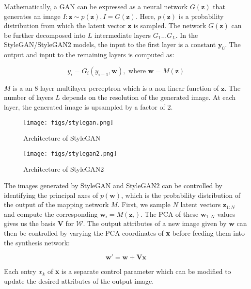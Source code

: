 Mathematically, a GAN can be expressed as a neural network $G(\textbf{z})$ that generates an image $I: \textbf{z} \sim p(\textbf{z}), I = G(\textbf{z})$. Here, $p(\textbf{z})$ is a probability distribution from which the latent vector $\textbf{z}$ is sampled. The network $G(\textbf{z})$ can be further decomposed into $L$ intermediate layers $G_1\ldots G_L$. In the StyleGAN/StyleGAN2 models, the input to the first layer is a constant $\textbf{y}_0$. The output and input to the remaining layers is computed as:

\begin{equation}
  y_i = G_i(y_{i-1}, \mathbf{w}),\text{ where }\mathbf{w} = M(\mathbf{z})
\end{equation}

$M$ is a an $8$-layer multilayer perceptron which is a non-linear function of $\textbf{z}$. The number of layers $L$ depends on the resolution of the generated image. At each layer, the generated image is upsampled by a factor of $2$.

\begin{figure}[H]
  \centering
  \texttt{[image: figs/stylegan.png]}
  \caption{Architecture of StyleGAN \cite{stylegan}}
  \label{fig:stylegan}
\end{figure}

\begin{figure}[H]
  \centering
  \texttt{[image: figs/stylegan2.png]}
  \caption{Architecture of StyleGAN2 \cite{stylegan2}}
  \label{fig:stylegan2}
\end{figure}

The images generated by StyleGAN and StyleGAN2 can be controlled by identifying the principal axes of $p(\textbf{w})$, which is the probability distribution of the output of the mapping network $M$. First, we sample $N$ latent vectors $\textbf{z}_{1:N}$ and compute the corresponding $\textbf{w}_{i} = M(\textbf{z}_{i})$. The PCA of these $\textbf{w}_{1:N}$ values gives us the basis $\textbf{V}$ for $\mathcal{W}$. The output attributes of a new image given by $\textbf{w}$ can then be controlled by varying the PCA coordinates of \textbf{x} before feeding them into the synthesis network:

\begin{equation}
    \mathbf{w'} = \mathbf{w} + \mathbf{Vx}
\end{equation}

Each entry $x_{k}$ of \textbf{x} is a separate control parameter which can be modified to update the desired attributes of the output image.

